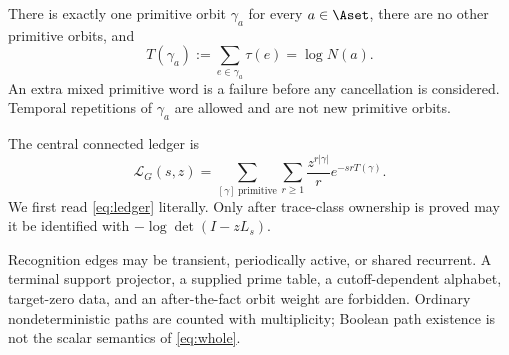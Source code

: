 \begin{definition}
There is exactly one primitive orbit $\gamma_a$ for every $a\in\Aset$, there
are no other primitive orbits, and
\begin{equation}\label{eq:clock}
T(\gamma_a):=\sum_{e\in\gamma_a}\tau(e)=\log N(a).
\end{equation}
An extra mixed primitive word is a failure before any cancellation is
considered.  Temporal repetitions of $\gamma_a$ are allowed and are not new
primitive orbits.
\end{definition}

The central connected ledger is
\begin{equation}\label{eq:ledger}
\mathcal L_G(s,z)=
\sum_{[\gamma]\ \mathrm{primitive}}\sum_{r\ge1}
\frac{z^{r|\gamma|}}{r}e^{-srT(\gamma)}.
\end{equation}
We first read \eqref{eq:ledger} literally.  Only after trace-class ownership
is proved may it be identified with $-\log\det(I-zL_s)$.

Recognition edges may be transient, periodically active, or shared recurrent.
A terminal support projector, a supplied prime table, a cutoff-dependent
alphabet, target-zero data, and an after-the-fact orbit weight are forbidden.
Ordinary nondeterministic paths are counted with multiplicity; Boolean path
existence is not the scalar semantics of \eqref{eq:whole}.

